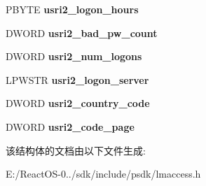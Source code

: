 \begin{DoxyCompactItemize}
\item 
\mbox{\label{struct___u_s_e_r___i_n_f_o__2_aab668e716bb30521c0b0e6cd825b606f}} 
P\+B\+Y\+TE {\bfseries usri2\+\_\+logon\+\_\+hours}
\item 
\mbox{\label{struct___u_s_e_r___i_n_f_o__2_a4b6ddddc8592fb5a2861a7d0874b8766}} 
D\+W\+O\+RD {\bfseries usri2\+\_\+bad\+\_\+pw\+\_\+count}
\item 
\mbox{\label{struct___u_s_e_r___i_n_f_o__2_a193eef8b7efa843e4a877ce960fc339b}} 
D\+W\+O\+RD {\bfseries usri2\+\_\+num\+\_\+logons}
\item 
\mbox{\label{struct___u_s_e_r___i_n_f_o__2_a2157b03aeb30cf7832c571e741096270}} 
L\+P\+W\+S\+TR {\bfseries usri2\+\_\+logon\+\_\+server}
\item 
\mbox{\label{struct___u_s_e_r___i_n_f_o__2_a8b014f81ed6476ec344256ca24fee62f}} 
D\+W\+O\+RD {\bfseries usri2\+\_\+country\+\_\+code}
\item 
\mbox{\label{struct___u_s_e_r___i_n_f_o__2_a99f5fbf15ebc4e0fc1e8537f61344969}} 
D\+W\+O\+RD {\bfseries usri2\+\_\+code\+\_\+page}
\end{DoxyCompactItemize}


该结构体的文档由以下文件生成\+:\begin{DoxyCompactItemize}
\item 
E\+:/\+React\+O\+S-\/0../sdk/include/psdk/lmaccess.\+h\end{DoxyCompactItemize}
